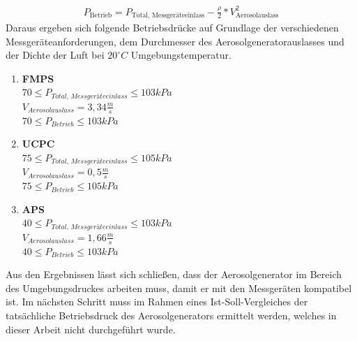 \begin{align*}
	P_\text{Betrieb} = P_\text{Total, Messger\"{a}teeinlass} - \frac{\rho}{2} * V_			\text{Aerosolauslass}^2
\end{align*}
Daraus ergeben sich folgende Betriebsdr\"{u}cke auf Grundlage der verschiedenen Messger\"{a}teanforderungen, dem Durchmesser des Aerosolgeneratorauslasses und der Dichte der Luft bei \(20^\circ C\) Umgebungstemperatur\cite{fmps_3091}\cite{ops_3330}\cite{ucpc_3776}\cite{aps_3321}\cite{topas}.
\begin{enumerate}
	\item \textbf{FMPS}\\
	\(70 \leq P_\textit{Total, Messger\"{a}teeinlass} \leq 103 kPa\)\\
	\(V_\textit{Aerosolauslass} = 3,34 \frac{m}{s}\)\\
	\(70 \leq P_\textit{Betrieb} \leq 103 kPa\)\\
	\item \textbf{UCPC}\\
	\(75 \leq P_\textit{Total, Messger\"{a}teeinlass} \leq 105 kPa\)\\
	\(V_\textit{Aerosolauslass} = 0,5 \frac{m}{s}\)\\
	\(75 \leq P_\textit{Betrieb} \leq 105 kPa\)\\
	\item \textbf{APS}\\
	\(40 \leq P_\textit{Total, Messger\"{a}teeinlass} \leq 103 kPa\)\\
	\(V_\textit{Aerosolauslass} = 1,66 \frac{m}{s}\)\\
	\(40 \leq P_\textit{Betrieb} \leq 103 kPa\)
\end{enumerate} 
Aus den Ergebnissen l\"{a}sst sich schlie{\ss}en, dass der Aerosolgenerator im Bereich des Umgebungsdruckes arbeiten muss, damit er mit den Messger\"{a}ten kompatibel ist. Im n\"{a}chsten Schritt muss im Rahmen eines Ist-Soll-Vergleiches der tats\"{a}chliche Betriebsdruck des Aerosolgenerators ermittelt werden, welches in dieser Arbeit nicht durchgef\"{u}hrt wurde.
